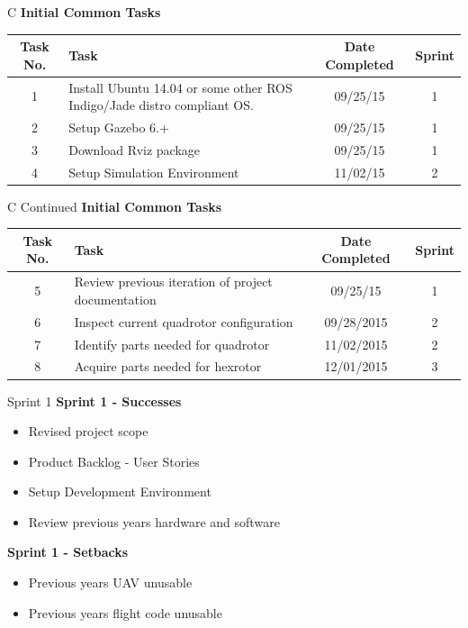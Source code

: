 \documentclass[11pt]{beamer}
\begin{document}
\begin{frame}{C}
\textbf{Initial Common Tasks}
\begin{tabular}{| c | >{\raggedright}m{4cm} | c | c |}\hline
Task No. & Task & Date Completed & Sprint\\\hline
1 & Install Ubuntu 14.04 or some other ROS Indigo/Jade distro compliant OS. & 09/25/15 & 1 \\\hline
2 & Setup Gazebo 6.+ & 09/25/15 & 1 \\\hline
3 & Download Rviz package & 09/25/15 & 1\\\hline
4 & Setup Simulation Environment & 11/02/15 & 2 \\\hline
\end{tabular}
\end{frame}


\begin{frame}{C Continued}
\textbf{Initial Common Tasks}
\begin{tabular}{| c | >{\raggedright}m{4cm} | c | c |}\hline
Task No. & Task & Date Completed & Sprint\\\hline
5 & Review previous iteration of project documentation & 09/25/15 & 1 \\\hline
6 & Inspect current quadrotor configuration & 09/28/2015 & 2\\\hline
7 & Identify parts needed for quadrotor & 11/02/2015 & 2 \\\hline
8 & Acquire parts needed for hexrotor & 12/01/2015 & 3 \\\hline
\end{tabular}
\end{frame}


 \begin{frame}{Sprint 1}
	\large{\textbf{Sprint 1 - Successes}}
\begin{itemize}
	\item Revised project scope
	\item Product Backlog - User Stories
	\item Setup Development Environment
	\item Review previous years hardware and software
\end{itemize}

	\large{\textbf{Sprint 1 - Setbacks}}
	\begin{itemize}
		\item Previous years UAV unusable
		\item Previous years flight code unusable
	\end{itemize}
 \end{frame}
 
\end{document}
